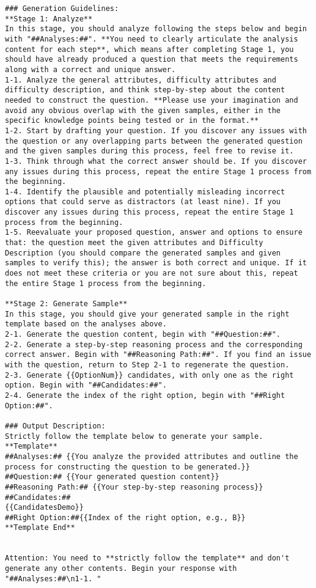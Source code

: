 \begin{lstlisting}
### Generation Guidelines:
**Stage 1: Analyze**
In this stage, you should analyze following the steps below and begin with "##Analyses:##". **You need to clearly articulate the analysis content for each step**, which means after completing Stage 1, you should have already produced a question that meets the requirements along with a correct and unique answer.
1-1. Analyze the general attributes, difficulty attributes and difficulty description, and think step-by-step about the content needed to construct the question. **Please use your imagination and avoid any obvious overlap with the given samples, either in the specific knowledge points being tested or in the format.**
1-2. Start by drafting your question. If you discover any issues with the question or any overlapping parts between the generated question and the given samples during this process, feel free to revise it.
1-3. Think through what the correct answer should be. If you discover any issues during this process, repeat the entire Stage 1 process from the beginning.
1-4. Identify the plausible and potentially misleading incorrect options that could serve as distractors (at least nine). If you discover any issues during this process, repeat the entire Stage 1 process from the beginning.
1-5. Reevaluate your proposed question, answer and options to ensure that: the question meet the given attributes and Difficulty Description (you should compare the generated samples and given samples to verify this); the answer is both correct and unique. If it does not meet these criteria or you are not sure about this, repeat the entire Stage 1 process from the beginning.

**Stage 2: Generate Sample**
In this stage, you should give your generated sample in the right template based on the analyses above.
2-1. Generate the question content, begin with "##Question:##".
2-2. Generate a step-by-step reasoning process and the corresponding correct answer. Begin with "##Reasoning Path:##". If you find an issue with the question, return to Step 2-1 to regenerate the question.
2-3. Generate {{OptionNum}} candidates, with only one as the right option. Begin with "##Candidates:##".
2-4. Generate the index of the right option, begin with "##Right Option:##".

### Output Description:
Strictly follow the template below to generate your sample.
**Template**
##Analyses:## {{You analyze the provided attributes and outline the process for constructing the question to be generated.}}
##Question:## {{Your generated question content}}
##Reasoning Path:## {{Your step-by-step reasoning process}}
##Candidates:##
{{CandidatesDemo}}
##Right Option:##{{Index of the right option, e.g., B}}
**Template End**


Attention: You need to **strictly follow the template** and don't generate any other contents. Begin your response with "##Analyses:##\n1-1. "
\end{lstlisting}


